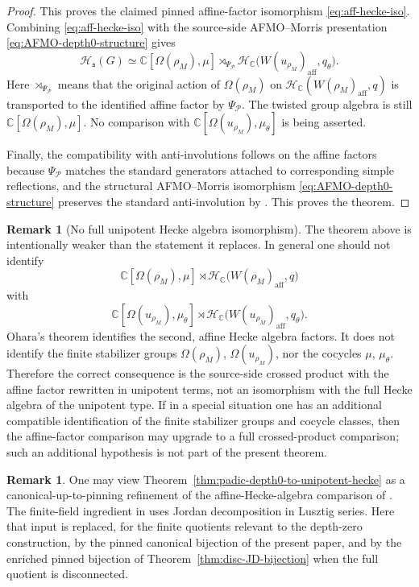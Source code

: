 \documentclass{amsart}
\theoremstyle{plain}
\numberwithin{equation}{section}
\theoremstyle{definition}
\newtheorem{remark}[theorem]{Remark}
\newcommand{\cP}{\mathcal{P}}
\newcommand{\cH}{\mathcal{H}}
\newcommand{\C}{\mathbb{C}}
\begin{document}
\begin{proof}
This proves the claimed pinned affine-factor isomorphism \eqref{eq:aff-hecke-iso}.
Combining \eqref{eq:aff-hecke-iso} with the source-side AFMO--Morris presentation
\eqref{eq:AFMO-depth0-structure} gives
\[
\cH_{\mathfrak s}(G)
\simeq
\C[\Omega(\rho_M),\mu]\rtimes_{\Psi_{\cP}}
\cH_{\C}\!\bigl(W(u_{\rho_M})_{\mathrm{aff}},q_\theta\bigr).
\]
Here \(\rtimes_{\Psi_{\cP}}\) means that the original action of
\(\Omega(\rho_M)\) on
\(\cH_{\C}(W(\rho_M)_{\mathrm{aff}},q)\) is transported to the identified affine
factor by \(\Psi_{\cP}\).  The twisted group algebra is still
\(\C[\Omega(\rho_M),\mu]\).  No comparison with
\(\C[\Omega(u_{\rho_M}),\mu_\theta]\) is being asserted.

Finally, the compatibility with anti-involutions follows on the affine factors
because \(\Psi_{\cP}\) matches the standard generators attached to corresponding
simple reflections, and the structural AFMO--Morris isomorphism
\eqref{eq:AFMO-depth0-structure} preserves the standard anti-involution by
\cite[Theorem~4.2.2]{ohara2025}.  This proves the theorem.
\end{proof}

\begin{remark}[No full unipotent Hecke algebra isomorphism]
The theorem above is intentionally weaker than the statement it replaces.  In
general one should not identify
\[
\C[\Omega(\rho_M),\mu]\rtimes
\cH_{\C}\!\bigl(W(\rho_M)_{\mathrm{aff}},q\bigr)
\]
with
\[
\C[\Omega(u_{\rho_M}),\mu_\theta]\rtimes
\cH_{\C}\!\bigl(W(u_{\rho_M})_{\mathrm{aff}},q_\theta\bigr).
\]
Ohara's theorem identifies the second, affine Hecke algebra factors.  It does not
identify the finite stabilizer groups \(\Omega(\rho_M)\), \(\Omega(u_{\rho_M})\),
nor the cocycles \(\mu\), \(\mu_\theta\).  Therefore the correct consequence is the
source-side crossed product with the affine factor rewritten in unipotent terms,
not an isomorphism with the full Hecke algebra of the unipotent type.  If in a
special situation one has an additional compatible identification of the finite
stabilizer groups and cocycle classes, then the affine-factor comparison may
upgrade to a full crossed-product comparison; such an additional hypothesis is
not part of the present theorem.
\end{remark}

\begin{remark}
One may view Theorem~\ref{thm:padic-depth0-to-unipotent-hecke} as a canonical-up-to-pinning
refinement of the affine-Hecke-algebra comparison of \cite[Theorem~4.4.1]{ohara2025}.
The finite-field ingredient in \cite{ohara2025} uses Jordan decomposition in
Lusztig series.  Here that input is replaced, for the finite quotients relevant
to the depth-zero construction, by the pinned canonical bijection of the present
paper, and by the enriched pinned bijection of Theorem~\ref{thm:disc-JD-bijection}
when the full quotient is disconnected.
\end{remark}
\end{document}
